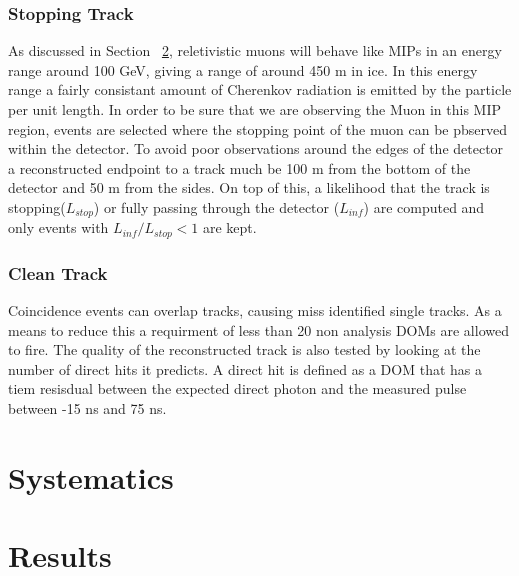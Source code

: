\documentclass[a4paper,onecolumn, 12pt]{article}
\begin{document}
\subsubsection{Stopping Track}
As discussed in Section ~\ref{}, reletivistic muons will behave like MIPs in an energy range around 100 GeV, giving a range of around 450 m in ice. In this energy range a fairly consistant amount of Cherenkov radiation is emitted by the particle per unit length. In order to be sure that we are observing the Muon in this MIP region, events are selected where the stopping point of the muon can be pbserved within the detector. To avoid poor observations around the edges of the detector a reconstructed endpoint to a track much be 100 m from the bottom of the detector and 50 m from the sides. On top of this, a likelihood that the track is stopping($L_{stop}$) or fully passing through the detector ($L_{inf}$) are computed and only events with $L_{inf}/L_{stop} < 1$ are kept.

\subsubsection{Clean Track}
Coincidence events can overlap tracks, causing miss identified single tracks. As a means to reduce this a requirment of less than 20 non analysis DOMs are allowed to fire. The quality of the reconstructed track is also tested by looking at the number of direct hits it predicts. A direct hit is defined as a DOM that has a tiem resisdual between the expected direct photon and the measured pulse between -15 ns and 75 ns. 

\section{Systematics}

\section{Results}
\end{document}
